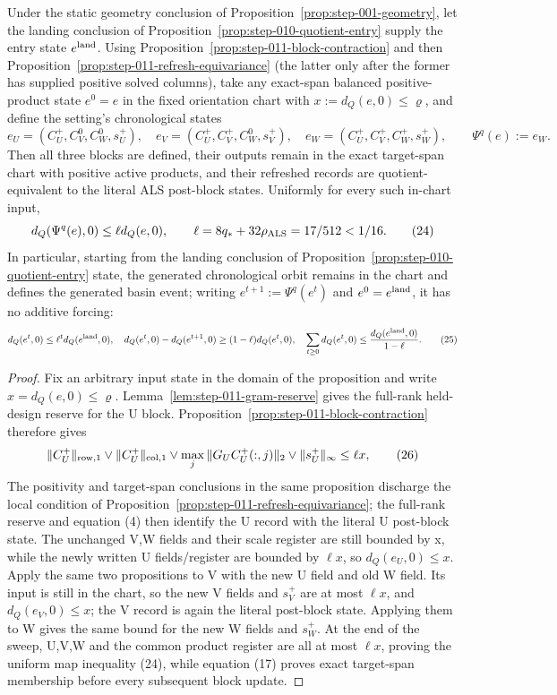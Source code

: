 \begin{proposition}\label{prop:step-011-chronological-contraction}
Under the static geometry conclusion of Proposition~\ref{prop:step-001-geometry},
let the landing conclusion of Proposition~\ref{prop:step-010-quotient-entry}
supply the entry state \(e^{\rm land}\). Using
Proposition~\ref{prop:step-011-block-contraction} and then
Proposition~\ref{prop:step-011-refresh-equivariance} (the latter only after
the former has supplied positive solved columns), take any exact-span
balanced positive-product state \(e^0=e\) in the fixed orientation chart
with \(x:=d_Q(e,0)\le\varrho\), and define the setting's chronological states
\[
 e_U=(C_U^+,C_V^0,C_W^0,s_U^+),\quad
 e_V=(C_U^+,C_V^+,C_W^0,s_V^+),\quad
 e_W=(C_U^+,C_V^+,C_W^+,s_W^+),
 \qquad \Psi^q(e):=e_W.
\tag{23}
\]
Then all three blocks are defined, their outputs remain in the exact
target-span chart with positive active products, and their refreshed records
are quotient-equivalent to the literal ALS post-block states. Uniformly for
every such in-chart input,
\[
 d_Q(\Psi^q(e),0)\le\ell d_Q(e,0),
 \qquad \ell=8q_*+32\rho_{\rm ALS}=17/512<1/16.
\tag{24}
\]
In particular, starting from the landing conclusion of Proposition~\ref{prop:step-010-quotient-entry} state, the generated
chronological orbit remains in the chart and defines the generated basin event; writing
\(e^{t+1}:=\Psi^q(e^t)\) and \(e^0=e^{\rm land}\), it has no additive forcing:
\[
 d_Q(e^t,0)\le\ell^t d_Q(e^{\rm land},0),
 \quad
 d_Q(e^t,0)-d_Q(e^{t+1},0)\ge(1-\ell)d_Q(e^t,0),
 \quad
 \sum_{t\ge0}d_Q(e^t,0)\le{d_Q(e^{\rm land},0)\over1-\ell}.
\tag{25}
\]

\begin{proof}
Fix an arbitrary input state in the domain of the
proposition and write \(x=d_Q(e,0)\le\varrho\). Lemma~\ref{lem:step-011-gram-reserve}
gives the full-rank held-design reserve for the U block. Proposition~\ref{prop:step-011-block-contraction}
therefore gives
\[
  \|C_U^+\|_{\rm row,1}\vee\|C_U^+\|_{\rm col,1}
  \vee\max_j\|G_UC_U^+(:,j)\|_2\vee\|s_U^+\|_\infty
  \le\ell x,
\tag{26}
\]
The positivity and target-span conclusions in the same proposition discharge
the local condition of Proposition~\ref{prop:step-011-refresh-equivariance};
the full-rank reserve and equation (4) then identify the U record with the
literal U post-block state. The unchanged V,W fields and their scale register
are still bounded by x, while the newly written U fields/register are bounded
by \(\ell x\), so \(d_Q(e_U,0)\le x\). Apply
the same two propositions to V with the new U field and old W field. Its input
is still in the chart, so the new V fields and \(s_V^+\) are at most
\(\ell x\), and \(d_Q(e_V,0)\le x\); the V record is again the literal
post-block state. Applying them to W gives the same bound for the new W
fields and \(s_W^+\). At the end of the sweep, U,V,W and the common product
register are all at most \(\ell x\), proving the uniform map inequality
(24), while equation (17) proves exact target-span membership before every
subsequent block update.


\end{proof}
\end{proposition}
